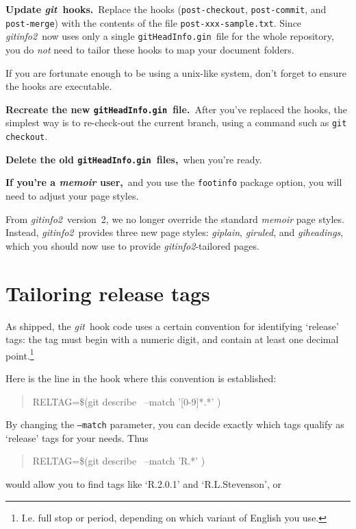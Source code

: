 \documentclass[a4paper,12pt,twoside,openany]{memoir}
\newcommand{\bpara}[1]{\par\vspace{\beforeparaskip}\noindent\textbf{#1}\,}
\newcommand{\sfit}[1]{\textit{#1}}
\newcommand{\git}{\sfit{git}}
\newcommand{\tpname}{\sfit{gitinfo2}}
\newcommand{\ginname}{gitHeadInfo.gin}
\newcommand{\metaname}{\texttt{\ginname}}
\begin{document}
\bpara{Update \git\ hooks.}
Replace the hooks (\texttt{post-checkout}, \texttt{post-commit},
and \texttt{post-merge}) with the contents of the file \texttt{post-xxx-sample.txt}.
Since \tpname\ now uses only a single \metaname\ file for the whole repository,
you do \emph{not} need to tailor these hooks to map your document folders.

If you are fortunate enough to be using a unix-like system,
don't forget to ensure the hooks are executable.

\bpara{Recreate the new \metaname\ file.}
After you've replaced the hooks, the simplest way is to re-check-out the current branch,
using a command such as \verb!git checkout!.

\bpara{Delete the old \metaname\ files,}
when you're ready.

\bpara{If you're a \sfit{memoir} user,}
and you use the \texttt{footinfo} package option,
you will need to adjust your page styles.

From \tpname\ version~2, we no longer override the standard \sfit{memoir}
page styles.
Instead, \tpname\ provides three new page styles:
\sfit{giplain}, \sfit{giruled}, and \sfit{giheadings},
which you should now use to provide \tpname-tailored pages.

\section{Tailoring release tags}

As shipped, the \git\ hook code uses a certain convention
for identifying `release' tags:
the tag must begin with a numeric digit, and contain at least one decimal
point.\footnote{I.e. full stop or period, depending on which variant of English you use.}

Here is the line in the hook where this convention is established:

\begin{quotation}
{\ttfamily
RELTAG=\$(git describe \textellipsis\ --match '[0-9]*.*' \textellipsis)
}
\end{quotation}

By changing the \texttt{--match} parameter, you can decide exactly which tags
qualify as `release' tags for your needs. Thus

\begin{quotation}
{\ttfamily
RELTAG=\$(git describe \textellipsis\ --match 'R.*' \textellipsis)
}
\end{quotation}
would allow you to find tags like `R.2.0.1' and `R.L.Stevenson',
or
\end{document}
